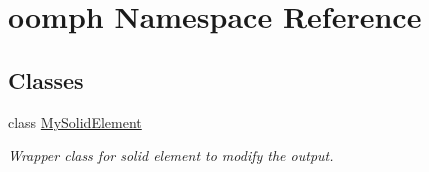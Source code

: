 \hypertarget{namespaceoomph}{}\section{oomph Namespace Reference}
\label{namespaceoomph}
\subsection*{Classes}
\begin{DoxyCompactItemize}
\item 
class \hyperlink{classoomph_1_1MySolidElement}{My\+Solid\+Element}
\begin{DoxyCompactList}\small\item\em Wrapper class for solid element to modify the output. \end{DoxyCompactList}\end{DoxyCompactItemize}

